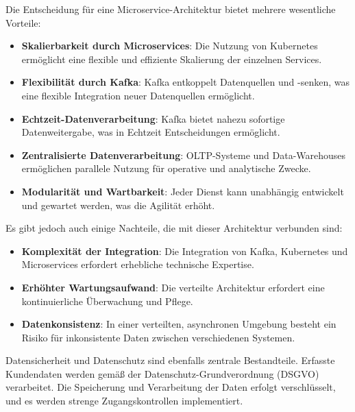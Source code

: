 \documentclass[%
pdftex,
oneside,			%
11pt,				%
parskip=half,		%
headheight = 12pt,	%
headsepline,		%
footsepline,		%
footheight = 16pt,	%
abstracton,		%
DIV=calc,		%
BCOR=8mm,		%
headinclude=false,	%
footinclude=false,	%
listof=totoc,		%
toc=bibliography,	%
]{scrreprt}	%
\begin{document}
    Die Entscheidung für eine Microservice-Architektur bietet mehrere wesentliche Vorteile:

    \begin{itemize}
        \item \textbf{Skalierbarkeit durch Microservices}: Die Nutzung von Kubernetes ermöglicht eine flexible und effiziente Skalierung der einzelnen Services.
        \item \textbf{Flexibilität durch Kafka}: Kafka entkoppelt Datenquellen und -senken, was eine flexible Integration neuer Datenquellen ermöglicht.
        \item \textbf{Echtzeit-Datenverarbeitung}: Kafka bietet nahezu sofortige Datenweitergabe, was in Echtzeit Entscheidungen ermöglicht.
        \item \textbf{Zentralisierte Datenverarbeitung}: OLTP-Systeme und Data-Warehouses ermöglichen parallele Nutzung für operative und analytische Zwecke.
        \item \textbf{Modularität und Wartbarkeit}: Jeder Dienst kann unabhängig entwickelt und gewartet werden, was die Agilität erhöht.
    \end{itemize}

    Es gibt jedoch auch einige Nachteile, die mit dieser Architektur verbunden sind:

    \begin{itemize}
        \item \textbf{Komplexität der Integration}: Die Integration von Kafka, Kubernetes und Microservices erfordert erhebliche technische Expertise.
        \item \textbf{Erhöhter Wartungsaufwand}: Die verteilte Architektur erfordert eine kontinuierliche Überwachung und Pflege.
        \item \textbf{Datenkonsistenz}: In einer verteilten, asynchronen Umgebung besteht ein Risiko für inkonsistente Daten zwischen verschiedenen Systemen.
    \end{itemize}


    Datensicherheit und Datenschutz sind ebenfalls zentrale Bestandteile.
    Erfasste Kundendaten werden gemäß der Datenschutz-Grundverordnung (DSGVO) verarbeitet.
    Die Speicherung und Verarbeitung der Daten erfolgt verschlüsselt, und es werden strenge Zugangskontrollen implementiert.
\end{document}
